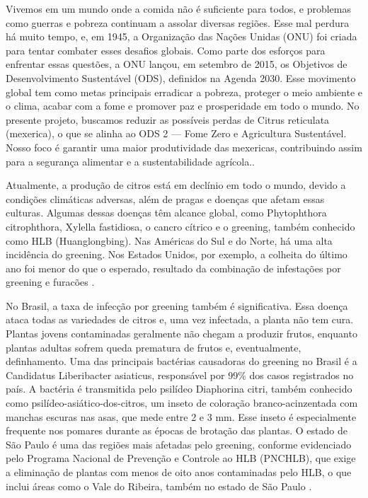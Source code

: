 Vivemos em um mundo onde a comida não é suficiente para todos, e problemas como guerras e pobreza continuam a assolar diversas regiões. Esse mal perdura há muito tempo, e, em 1945, a Organização das Nações Unidas (ONU) foi criada para tentar combater esses desafios globais. Como parte dos esforços para enfrentar essas questões, a ONU lançou, em setembro de 2015, os Objetivos de Desenvolvimento Sustentável (ODS), definidos na Agenda 2030. Esse movimento global tem como metas principais erradicar a pobreza, proteger o meio ambiente e o clima, acabar com a fome e promover paz e prosperidade em todo o mundo. No presente projeto, buscamos reduzir as possíveis perdas de Citrus reticulata (mexerica), o que se alinha ao ODS 2 — Fome Zero e Agricultura Sustentável. Nosso foco é garantir uma maior produtividade das mexericas, contribuindo assim para a segurança alimentar e a sustentabilidade agrícola.\cite{IntroduçãoGreening}.

Atualmente, a produção de citros está em declínio em todo o mundo, devido a condições climáticas adversas, além de pragas e doenças que afetam essas culturas. Algumas dessas doenças têm alcance global, como Phytophthora citrophthora, Xylella fastidiosa, o cancro cítrico e o greening, também conhecido como HLB (Huanglongbing). Nas Américas do Sul e do Norte, há uma alta incidência do greening. Nos Estados Unidos, por exemplo, a colheita do último ano foi menor do que o esperado, resultado da combinação de infestações por greening e furacões \cite{IntroduçãoEUAProblemas}.

No Brasil, a taxa de infecção por greening também é significativa. Essa doença ataca todas as variedades de citros e, uma vez infectada, a planta não tem cura. Plantas jovens contaminadas geralmente não chegam a produzir frutos, enquanto plantas adultas sofrem queda prematura de frutos e, eventualmente, definhamento. Uma das principais bactérias causadoras do greening no Brasil é a Candidatus Liberibacter asiaticus, responsável por 99\% dos casos registrados no país. A bactéria é transmitida pelo psilídeo Diaphorina citri, também conhecido como psilídeo-asiático-dos-citros, um inseto de coloração branco-acinzentada com manchas escuras nas asas, que mede entre 2 e 3 mm. Esse inseto é especialmente frequente nos pomares durante as épocas de brotação das plantas. O estado de São Paulo é uma das regiões mais afetadas pelo greening, conforme evidenciado pelo Programa Nacional de Prevenção e Controle ao HLB (PNCHLB), que exige a eliminação de plantas com menos de oito anos contaminadas pelo HLB, o que inclui áreas como o Vale do Ribeira, também no estado de São Paulo \cite{IntroduçãoGreening}.

